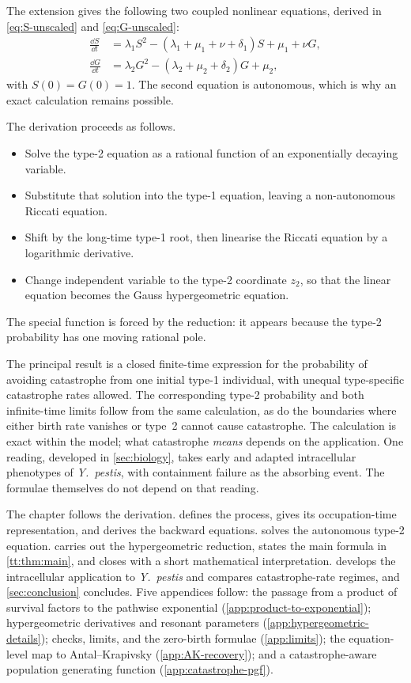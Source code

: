 The extension gives the following two coupled nonlinear equations, derived in \eqref{eq:S-unscaled} and \eqref{eq:G-unscaled}:
\begin{align*}
\frac{\dd S}{\dd t}
&=\lambda_1S^2-(\lambda_1+\mu_1+\nu+\delta_1)S
+\mu_1+\nu G,\\
\frac{\dd G}{\dd t}
&=\lambda_2G^2-(\lambda_2+\mu_2+\delta_2)G
+\mu_2,
\end{align*}
with $S(0)=G(0)=1$. The second equation is autonomous, which is why an exact calculation remains possible.

\begin{samepage}
The derivation proceeds as follows.
\begin{itemize}[leftmargin=1.6em,itemsep=0.25em,topsep=0.35em]
\item Solve the type-2 equation as a rational function of an exponentially decaying variable.
\item Substitute that solution into the type-1 equation, leaving a non-autonomous Riccati equation.
\item Shift by the long-time type-1 root, then linearise the Riccati equation by a logarithmic derivative.
\item Change independent variable to the type-2 coordinate $z_2$, so that the linear equation becomes the Gauss hypergeometric equation.
\end{itemize}
The special function is forced by the reduction: it appears because the type-2 probability has one moving rational pole.
\end{samepage}

The principal result is a closed finite-time expression for the probability of avoiding catastrophe from one initial type-1 individual, with unequal type-specific catastrophe rates allowed. The corresponding type-2 probability and both infinite-time limits follow from the same calculation, as do the boundaries where either birth rate vanishes or type~2 cannot cause catastrophe. The calculation is exact within the model; what catastrophe \emph{means} depends on the application. One reading, developed in \cref{sec:biology}, takes early and adapted intracellular phenotypes of \textit{Y.\ pestis}, with containment failure as the absorbing event. The formulae themselves do not depend on that reading.

The chapter follows the derivation.  defines the process, gives its occupation-time representation, and derives the backward equations.  solves the autonomous type-2 equation.  carries out the hypergeometric reduction, states the main formula in \cref{tt:thm:main}, and closes with a short mathematical interpretation.  develops the intracellular application to \textit{Y.\ pestis} and compares catastrophe-rate regimes, and \cref{sec:conclusion} concludes. Five appendices follow: the passage from a product of survival factors to the pathwise exponential (\cref{app:product-to-exponential}); hypergeometric derivatives and resonant parameters (\cref{app:hypergeometric-details}); checks, limits, and the zero-birth formulae (\cref{app:limits}); the equation-level map to Antal--Krapivsky (\cref{app:AK-recovery}); and a catastrophe-aware population generating function (\cref{app:catastrophe-pgf}).
